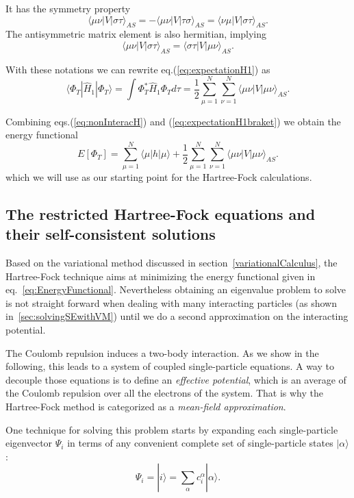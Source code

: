 It has the symmetry property
\[
\langle \mu \nu |V| \sigma \tau \rangle_{AS} = - \langle \mu \nu |V| \tau \sigma \rangle_{AS}=\langle \nu \mu |V| \sigma \tau \rangle_{AS}.
\]
The antisymmetric matrix element is also hermitian, implying
\[
\langle \mu \nu |V| \sigma \tau \rangle_{AS} =  \langle \sigma \tau |V| \mu \nu \rangle_{AS}.
\]

With these notations we can rewrite eq.(\ref{eq:expectationH1}) as
\begin{equation}
\label{eq:expectationH1braket}
\langle \Phi_T | \hat{H}_1 | \Phi_T  \rangle= \int \Phi_T^*\hat{H}_1 \Phi_T d\tau = \frac{1}{2}  \sum_{\mu=1}^N \sum_{\nu=1}^N \langle \mu \nu |V| \mu \nu \rangle_{AS}.
\end{equation}

Combining eqs.(\ref{eq:nonInteracH}) and (\ref{eq:expectationH1braket}) we obtain the energy functional
\begin{equation}
\label{eq:EnergyFunctional}
E[\Phi_T]=\sum_{\mu=1}^N \langle \mu |h| \mu \rangle + \frac{1}{2}  \sum_{\mu=1}^N \sum_{\nu=1}^N \langle \mu \nu |V| \mu \nu \rangle_{AS}.
\end{equation}
which we will use as our starting point for the Hartree-Fock calculations.




\subsection{The restricted Hartree-Fock equations and their self-consistent solutions}
\label{HFdetails}

Based on the variational method discussed in section~\ref{variationalCalculus}, the Hartree-Fock technique aims at minimizing the energy functional given in eq.~\ref{eq:EnergyFunctional}. Nevertheless obtaining an eigenvalue problem to solve is not straight forward when dealing with many interacting particles (as shown in~\ref{sec:solvingSEwithVM}) until we do a second approximation on the interacting potential.

The Coulomb repulsion induces a two-body interaction. As we show in the following, this leads to a system of coupled single-particle equations. A way to decouple those equations is to define an \textit{effective potential}, which is an average of the Coulomb repulsion over all the electrons of the system. That is why the Hartree-Fock method is categorized as a \textit{mean-field approximation}.

One technique for solving this problem starts by expanding each single-particle eigenvector $\Psi_i$ in terms of any convenient complete set of single-particle states $|\alpha \rangle$:
\begin{equation}
\label{eq:expansionSinglePart}
\Psi_i= |i \rangle = \sum_{\alpha} c_i^\alpha |\alpha \rangle.
\end{equation}

